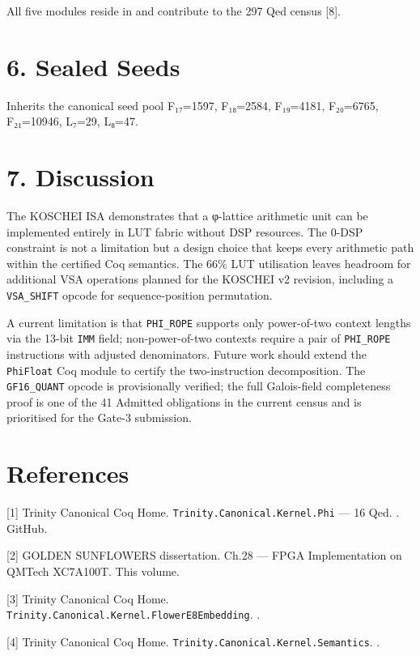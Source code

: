 All five modules reside in
 and
contribute to the 297 Qed census [8].

\section{6. Sealed Seeds}\label{fa_26:sealed-seeds}

Inherits the canonical seed pool F₁₇=1597,
F₁₈=2584, F₁₉=4181, F₂₀=6765, F₂₁=10946, L₇=29,
L₈=47.

\section{7. Discussion}\label{fa_26:discussion}

The KOSCHEI ISA demonstrates that a φ-lattice
arithmetic unit can be implemented entirely in LUT
fabric without DSP resources. The 0-DSP constraint
is not a limitation but a design choice that keeps
every arithmetic path within the certified Coq
semantics. The 66\% LUT utilisation leaves
headroom for additional VSA operations planned for
the KOSCHEI v2 revision, including a
\texttt{VSA\_SHIFT} opcode for sequence-position
permutation.

A current limitation is that \texttt{PHI\_ROPE}
supports only power-of-two context lengths via the
13-bit \texttt{IMM} field; non-power-of-two
contexts require a pair of \texttt{PHI\_ROPE}
instructions with adjusted denominators. Future
work should extend the \texttt{PhiFloat} Coq
module to certify the two-instruction
decomposition. The \texttt{GF16\_QUANT} opcode is
provisionally verified; the full Galois-field
completeness proof is one of the 41 Admitted
obligations in the current census and is
prioritised for the Gate-3 submission.

\section{References}\label{fa_26:references}

[1] Trinity Canonical Coq Home.
\texttt{Trinity.Canonical.Kernel.Phi} --- 16 Qed.
. GitHub.

[2] GOLDEN SUNFLOWERS dissertation. Ch.28 ---
FPGA Implementation on QMTech XC7A100T. This
volume.

[3] Trinity Canonical Coq Home.
\texttt{Trinity.Canonical.Kernel.FlowerE8Embedding}.
.

[4] Trinity Canonical Coq Home.
\texttt{Trinity.Canonical.Kernel.Semantics}.
.

